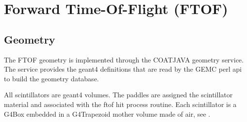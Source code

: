 \section{Forward Time-Of-Flight (FTOF)}

\subsection{Geometry}

The FTOF geometry is implemented through the COATJAVA geometry service.
The service provides the geant4 definitions that are read by the GEMC perl api to build the geometry database.

All scintillators are geant4 volumes. The paddles are assigned the scintillator material and associated with the ftof hit process routine.
Each scintillator is a G4Box embedded in a G4Trapezoid mother volume made of air, see . 

